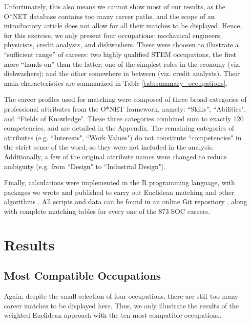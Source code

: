 \documentclass{article}
\begin{document}
Unfortunately, this also means we cannot show most of our results, as the O*NET
database contains too many career paths, and the scope of an introductory
article does not allow for all their matches to be displayed. Hence, for this
exercise, we only present four occupations: mechanical engineers, physicists,
credit analysts, and dishwashers. These were choosen to illustrate a
``sufficient range'' of careers: two highly qualified STEM occupations, the
first more ``hands-on'' than the latter; one of the simplest roles in the
economy (viz. dishwashers); and the other somewhere in between (viz. credit
analysts). Their main characteristics are summarized in Table
\ref{tab:summary_occupations}. \SummaryOccupations

The career profiles used for matching were composed of three broad categories
of professional attributes from the O*NET framework, namely: ``Skills",
``Abilities", and ``Fields of Knowledge". These three categories combined sum
to exactly 120 competencies, and are detailed in the Appendix. The remaining
categories of attributes (e.g. ``Interests", ``Work Values") do not constitute
``competencies" in the strict sense of the word, so they were not included in
the analysis. Additionally, a few of the original attribute names were changed
to reduce ambiguity (e.g. from ``Design" to ``Industrial Design").

Finally, calculations were implemented in the R programming language, with
packages we wrote and published to carry out Euclidean matching and other
algorithms \parencite{atlas.match}. All scripts and data can be found in an
online Git repository \parencite{intro_career_matching}, along with complete
matching tables for every one of the 873 SOC careers.

\section{Results}

\subsection{Most Compatible Occupations}
Again, despite the small selection of four occupations, there are still too
many career matches to be displayed here. Thus, we only illustrate the results
of the weighted Euclidean approach with the ten most compatible occupations.
\MatchesEngineers \MatchesPhysicists \MatchesCreditAnalysts \MatchesDishwashers
\end{document}
